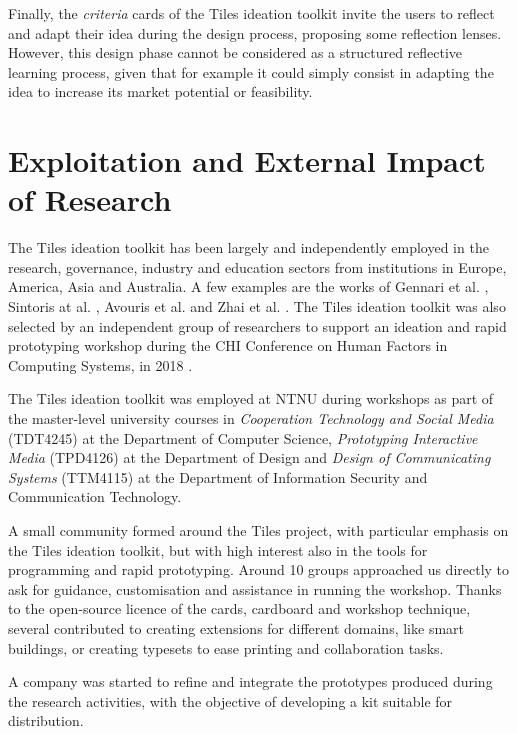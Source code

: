 Finally, the \textit{criteria} cards of the Tiles ideation toolkit invite the users to reflect and adapt their idea during the design process, proposing some reflection lenses. However, this design phase cannot be considered as a structured reflective learning process, given that for example it could simply consist in adapting the idea to increase its market potential or feasibility.


\section{Exploitation and External Impact of Research}
\label{sec:exploitation}

The Tiles ideation toolkit has been largely and independently employed in the research, governance, industry and education sectors from institutions in Europe, America, Asia and Australia.
A few examples are the works of 
Gennari et al. \autocite*{gennari_design_2017}, Sintoris at al. \autocite*{sintoris_out_2018}, Avouris et al. \autocite*{avouris_designing_2018} and  Zhai et al. \autocite*{zhai_co-sleep_2018}. The Tiles ideation toolkit was also selected by an independent group of researchers to support an ideation and rapid prototyping workshop during the CHI Conference on Human Factors in Computing Systems, in 2018 \autocite{angelini_internet_2018-1}.

The Tiles ideation toolkit was employed at NTNU during workshops as part of the master-level university courses in \textit{Cooperation Technology and Social Media} (TDT4245) at the Department of Computer Science, \textit{Prototyping Interactive Media} (TPD4126) at the Department of Design and \textit{Design of Communicating Systems} (TTM4115) at the Department of Information Security and Communication Technology.

A small community formed around the Tiles project, with particular emphasis on the Tiles ideation toolkit, but with high interest also in the tools for programming and rapid prototyping. Around 10 groups approached us directly to ask for guidance, customisation and assistance in running the workshop. Thanks to the open-source licence of the cards, cardboard and workshop technique, several contributed to creating extensions for different domains, like smart buildings, or creating typesets to ease printing and collaboration tasks.

A company was started to refine and integrate the prototypes produced during the research activities, with the objective of developing a kit suitable for distribution.